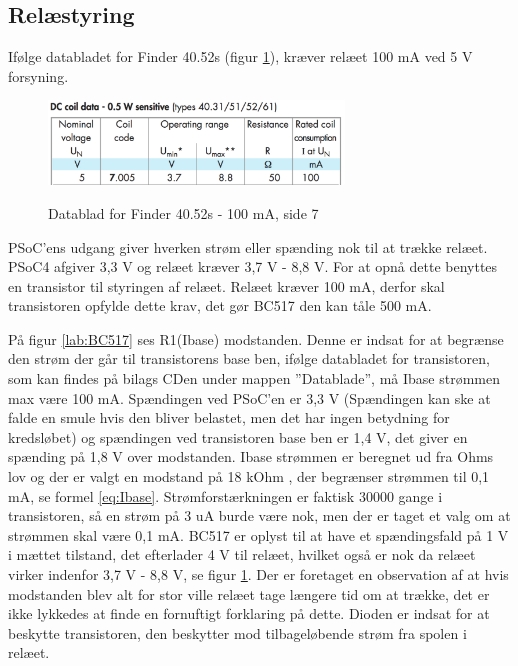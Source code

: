 \subsection{Relæstyring}

Ifølge databladet for Finder 40.52s (figur \ref{lab:finder4052s}), kræver relæet 100 mA ved 5 V forsyning.

\begin{figure}[H] \centering
{\includegraphics[width=0.7\textwidth]{filer/design/Billeder/finder4052s}}
\caption{Datablad for Finder 40.52s - 100 mA, side 7}
\label{lab:finder4052s}
\raggedright
\end{figure} 

PSoC'ens udgang giver hverken strøm eller spænding nok til at trække relæet. PSoC4 afgiver 3,3 V og relæet kræver 3,7 V - 8,8 V. For at opnå dette benyttes en transistor til styringen af relæet. Relæet kræver 100 mA, derfor skal transistoren opfylde dette krav, det gør BC517 den kan tåle 500 mA. \newline

På figur \ref{lab:BC517} ses R1(Ibase) modstanden. Denne er indsat for at begrænse den strøm der går til transistorens base ben, ifølge databladet for transistoren, som kan findes på bilags CDen under mappen ''Datablade'', må Ibase strømmen max være 100 mA. Spændingen ved PSoC'en er 3,3 V (Spændingen kan ske at falde en smule hvis den bliver belastet, men det har ingen betydning for kredsløbet) og spændingen ved transistoren base ben er 1,4 V, det giver en spænding på 1,8 V over modstanden. Ibase strømmen er beregnet ud fra Ohms lov og der er valgt en modstand på 18 kOhm , der begrænser strømmen til 0,1 mA, se formel \ref{eq:Ibase}.
\newline \newline
Strømforstærkningen er faktisk 30000 gange i transistoren, så en strøm på 3 uA burde være nok, men der er taget et valg om at strømmen skal være 0,1 mA. BC517 er oplyst til at have et spændingsfald på 1 V i mættet tilstand, det efterlader 4 V til relæet, hvilket også er nok da relæet virker indenfor 3,7 V - 8,8 V, se figur \ref{lab:finder4052s}. Der er foretaget en observation af at hvis modstanden blev alt for stor ville relæet tage længere tid om at trække, det er ikke lykkedes at finde en fornuftigt forklaring på dette. Dioden er indsat for at beskytte transistoren, den beskytter mod tilbageløbende strøm fra spolen i relæet.


